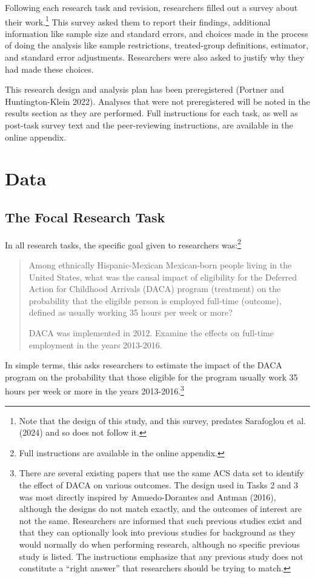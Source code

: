 \documentclass[
  letterpaper,
  DIV=11,
  numbers=noendperiod]{scrartcl}
\begin{document}
Following each research task and revision, researchers filled out a
survey about their work.\footnote{Note that the design of this study,
  and this survey, predates Sarafoglou et al. (2024) and so does not
  follow it.} This survey asked them to report their findings,
additional information like sample size and standard errors, and choices
made in the process of doing the analysis like sample restrictions,
treated-group definitions, estimator, and standard error adjustments.
Researchers were also asked to justify why they had made these choices.

This research design and analysis plan has been preregistered (Portner
and Huntington-Klein 2022). Analyses that were not preregistered will be
noted in the results section as they are performed. Full instructions
for each task, as well as post-task survey text and the peer-reviewing
instructions, are available in the online appendix.

\hypertarget{data}{%
\section{Data}\label{data}}

\hypertarget{sec-focaltask}{%
\subsection{The Focal Research Task}\label{sec-focaltask}}

In all research tasks, the specific goal given to researchers
was:\footnote{Full instructions are available in the online appendix.}

\begin{quote}
Among ethnically Hispanic-Mexican Mexican-born people living in the
United States, what was the causal impact of eligibility for the
Deferred Action for Childhood Arrivals (DACA) program (treatment) on the
probability that the eligible person is employed full-time (outcome),
defined as usually working 35 hours per week or more?

DACA was implemented in 2012. Examine the effects on full-time
employment in the years 2013-2016.
\end{quote}

In simple terms, this asks researchers to estimate the impact of the
DACA program on the probability that those eligible for the program
usually work 35 hours per week or more in the years
2013-2016.\footnote{There are several existing papers that use the same
  ACS data set to identify the effect of DACA on various outcomes. The
  design used in Tasks 2 and 3 was most directly inspired by
  Amuedo-Dorantes and Antman (2016), although the designs do not match
  exactly, and the outcomes of interest are not the same. Researchers
  are informed that such previous studies exist and that they can
  optionally look into previous studies for background as they would
  normally do when performing research, although no specific previous
  study is listed. The instructions emphasize that any previous study
  does not constitute a ``right answer'' that researchers should be
  trying to match.}
\end{document}
